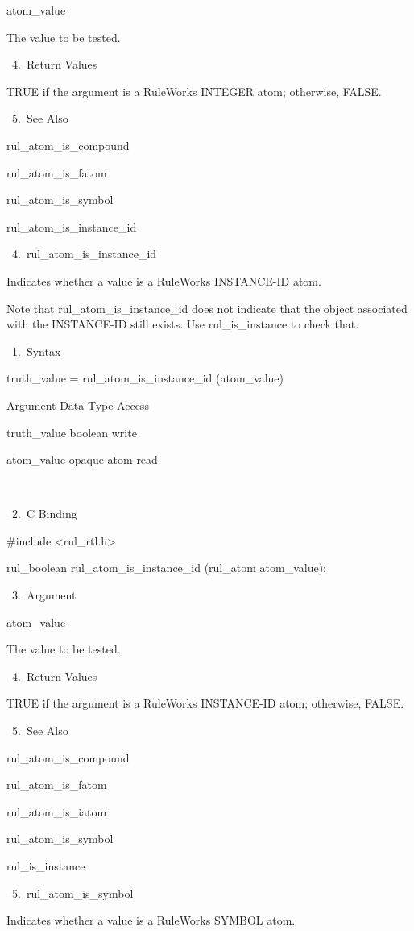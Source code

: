          atom_value

          The value to be tested.

       4. Return Values

          TRUE if the argument is a RuleWorks
          INTEGER atom; otherwise, FALSE.

       5. See Also

    rul_atom_is_compound

    rul_atom_is_fatom

    rul_atom_is_symbol

    rul_atom_is_instance_id

 4. rul_atom_is_instance_id

    Indicates whether a value is a RuleWorks
    INSTANCE-ID atom.

    Note that rul_atom_is_instance_id does not
    indicate that the object associated with
    the INSTANCE-ID still exists. Use
    rul_is_instance to check that.

       1. Syntax

          truth_value =
          rul_atom_is_instance_id (atom_value)

          Argument  Data Type    Access

          truth_value  boolean    write

          atom_value  opaque atom   read

           

       2. C Binding

          #include <rul_rtl.h>

          rul_boolean rul_atom_is_instance_id
          (rul_atom atom_value);

       3. Argument

          atom_value

          The value to be tested.

       4. Return Values

          TRUE if the argument is a RuleWorks
          INSTANCE-ID atom; otherwise, FALSE.

       5. See Also

    rul_atom_is_compound

    rul_atom_is_fatom

    rul_atom_is_iatom

    rul_atom_is_symbol

    rul_is_instance

 5. rul_atom_is_symbol

    Indicates whether a value is a RuleWorks
    SYMBOL atom.

